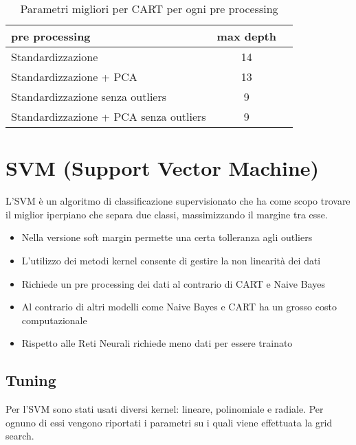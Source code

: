 \begin{table}[H]
\centering
\begin{tabular}{|l|c|c|}
\hline
\textbf{pre processing} & \textbf{max depth} \\ \hline
Standardizzazione & 14 \\ \hline
Standardizzazione + PCA & 13 \\ \hline
Standardizzazione senza outliers & 9 \\ \hline
Standardizzazione + PCA senza outliers & 9 \\ \hline
\end{tabular}
\caption{Parametri migliori per CART per ogni pre processing}
\label{tab:my-table}
\end{table}

\section{SVM (Support Vector Machine)}
L'SVM è un algoritmo di classificazione supervisionato che ha come scopo trovare il miglior iperpiano che separa due classi, massimizzando il margine tra esse.

\begin{itemize}
    \item Nella versione soft margin permette una certa tolleranza agli outliers
    \item L'utilizzo dei metodi kernel consente di gestire la non linearità dei dati
    \item Richiede un pre processing dei dati al contrario di CART e Naive Bayes
    \item Al contrario di altri modelli come Naive Bayes e CART ha un grosso costo computazionale
    \item Rispetto alle Reti Neurali richiede meno dati per essere trainato
\end{itemize}

\newpage

\subsection*{Tuning}
Per l'SVM sono stati usati diversi kernel: lineare, polinomiale e radiale. Per ognuno di essi vengono riportati i parametri su i quali viene effettuata la grid search.

\begin{table}[H]
\centering
{}
\caption{Parametri utilizzati per la grid search per i vari metodi kernel, range = (0.01, da 0.1 a 1.5 con passo 0.1, 2, 5, 10)}
\label{tab:my-table}
\end{table}

